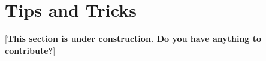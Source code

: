 \section{Tips and Tricks}
\label{tips}

[{\bf This section is under construction.  Do you have anything to contribute?}]



